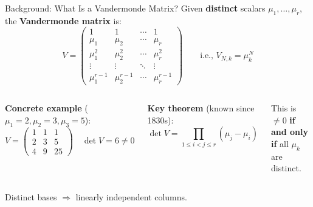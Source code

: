 \documentclass[aspectratio=169,10pt]{beamer}
\begin{document}
\begin{frame}{Background: What Is a Vandermonde Matrix?}
\vspace{-0.3em}
{\small Given \textbf{distinct} scalars $\mu_1, \dots, \mu_r$, the \textbf{Vandermonde matrix} is:}
\[
V = \begin{pmatrix}
1 & 1 & \cdots & 1 \\
\mu_1 & \mu_2 & \cdots & \mu_r \\
\mu_1^2 & \mu_2^2 & \cdots & \mu_r^2 \\
\vdots & \vdots & \ddots & \vdots \\
\mu_1^{r-1} & \mu_2^{r-1} & \cdots & \mu_r^{r-1}
\end{pmatrix}
\qquad\text{i.e., } V_{N,k} = \mu_k^N
\]

\vspace{-0.2em}
\begin{columns}[T]
{\small\textbf{Concrete example} ($\mu_1 = 2, \mu_2 = 3, \mu_3 = 5$):}
\[
V = \begin{pmatrix}
1 & 1 & 1 \\
2 & 3 & 5 \\
4 & 9 & 25
\end{pmatrix}
\quad \det V = 6 \neq 0
\]

{\small\textbf{Key theorem} (known since 1830s):}
\[
\det V = \prod_{1 \leq i < j \leq r} (\mu_j - \mu_i)
\]

\vspace{0.2em}
{\small This is $\neq 0$ \textbf{if and only if} all $\mu_k$ are distinct.}
\end{columns}

\vspace{0.5em}
{\small Distinct bases $\Rightarrow$ linearly independent columns.}
\end{frame}
\end{document}
